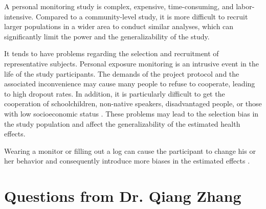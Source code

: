 \documentclass[11pt]{article}
\begin{document}
\begin{itemize*}
{\begin{enumerate*}[{[1)]}]
            \item A personal monitoring study is complex, expensive, time-consuming, and labor-intensive. Compared to a community-level study, it is more difficult to recruit larger populations in a wider area to conduct similar analyses, which can significantly limit the power and the generalizability of the study. 
            \item It tends to have problems regarding the selection and recruitment of representative subjects. Personal exposure monitoring is an intrusive event in the life of the study participants. The demands of the project protocol and the associated inconvenience may cause many people to refuse to cooperate, leading to high dropout rates. In addition, it is particularly difficult to get the cooperation of schoolchildren, non-native speakers, disadvantaged people, or those with low socioeconomic status \citep{watson1988air}. These problems may lead to the selection bias in the study population and affect the generalizability of the estimated health effects. 
            \item Wearing a monitor or filling out a log can cause the participant to change his or her behavior and consequently introduce more biases in the estimated effects \citep{ryan1986estimating}.
        \end{enumerate*}
    }
\end{itemize*}



\hdashrule{\textwidth}{0.1pt}{0.6mm 0.6mm}
\setcounter{section}{0}

\section*{Questions from Dr. Qiang Zhang}
\end{document}
